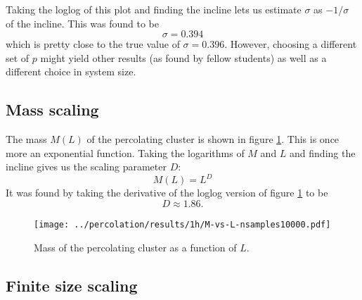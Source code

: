 \documentclass[a4paper,reprint,floatfix,amsmath,amssymb,aps,pra]{revtex4-1}
\begin{document}
Taking the loglog of this plot and finding the incline lets us estimate $\sigma$ as $-1/\sigma$ of the incline. This was found to be
\begin{equation}
  \sigma = 0.394
\end{equation} 
which is pretty close to the true value of $\sigma = 0.396$. However, choosing a different set of $p$ might yield other results (as found by fellow students) as well as a different choice in system size.

\subsection{Mass scaling}

The mass $M(L)$ of the percolating cluster is shown in figure \ref{fig:mass-scaling}. This is once more an exponential function. Taking the logarithms of $M$ and $L$ and finding the incline gives us the scaling parameter $D$:
\begin{equation}
  M(L) = L^{D}
\end{equation}
It was found by taking the derivative of the loglog version of figure \ref{fig:mass-scaling} to be
\begin{equation}
  D \approx 1.86.
\end{equation} 
\begin{figure}
  \centering
  \texttt{[image: ../percolation/results/1h/M-vs-L-nsamples10000.pdf]}
  \caption{Mass of the percolating cluster as a function of $L$.}
  \label{fig:mass-scaling}
\end{figure}

\subsection{Finite size scaling}
\end{document}
